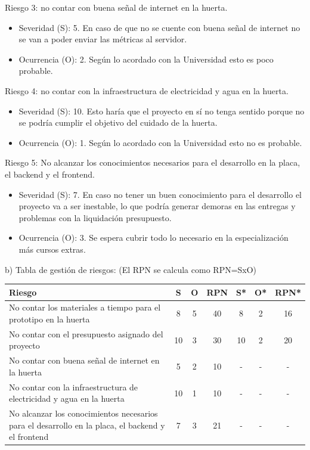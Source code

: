 \documentclass[
11pt, %
codirector, %
]{charter}
\begin{document}
Riesgo 3: no contar con buena señal de internet en la huerta.
\begin{itemize}
	\item Severidad (S): 5.
	En caso de que no se cuente con buena señal de internet no se van a poder enviar las métricas al servidor.
	\item Ocurrencia (O): 2.
	Según lo acordado con la Universidad esto es poco probable.
\end{itemize}

Riesgo 4: no contar con la infraestructura de electricidad y agua en la huerta.
\begin{itemize}
	\item Severidad (S): 10.
	Esto haría que el proyecto en sí no tenga sentido porque no se podría cumplir el objetivo del cuidado de la huerta.
	\item Ocurrencia (O): 1.
	Según lo acordado con la Universidad esto no es probable.
\end{itemize}

Riesgo 5: No alcanzar los conocimientos necesarios para el desarrollo en la placa, el backend y el frontend.
\begin{itemize}
	\item Severidad (S): 7.
	En caso no tener un buen conocimiento para el desarrollo el proyecto va a ser inestable, lo que podría generar demoras en las entregas y problemas con la liquidación presupuesto.
	\item Ocurrencia (O): 3.
	Se espera cubrir todo lo necesario en la especialización más cursos extras.
\end{itemize}

b) Tabla de gestión de riesgos:      (El RPN se calcula como RPN=SxO)

\begin{table}[htpb]
\centering
\begin{tabularx}{\linewidth}{@{}|X|c|c|c|c|c|c|@{}}
\hline
\rowcolor[HTML]{C0C0C0} 
Riesgo & S & O & RPN & S* & O* & RPN* \\ \hline
      No contar los materiales a tiempo para el prototipo en la huerta &   8&   5&     40&    8&    2& 16     \\ \hline
      No contar con el presupuesto asignado del proyecto &   10&   3&     30&   10 &   2 & 20     \\ \hline
      No contar con buena señal de internet en la huerta &   5&   2&     10&   - &  -  & -     \\ \hline
      No contar con la infraestructura de electricidad y agua en la huerta &  10 &   1&     10&    -&  -  & -     \\ \hline
      No alcanzar los conocimientos necesarios para el desarrollo en la placa, el backend y el frontend &  7 &  3 & 21 &   - &   - &  -    \\ \hline
\end{tabularx}%
\end{table}
\end{document}
